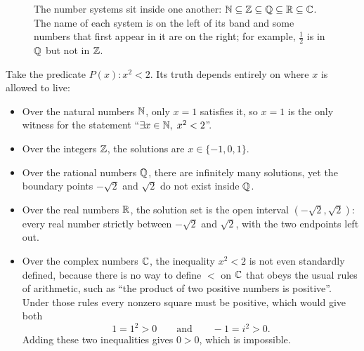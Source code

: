 \begin{figure}[htbp]
\centering
{}
\caption{The number systems sit inside one another: $\mathbb{N} \subseteq \mathbb{Z} \subseteq \mathbb{Q} \subseteq \mathbb{R} \subseteq \mathbb{C}$. The name of each system is on the left of its band and some numbers that first appear in it are on the right; for example, $\tfrac12$ is in $\mathbb{Q}$ but not in $\mathbb{Z}$.}
\label{02:fig-number-systems}
\end{figure}

Take the predicate $P(x) : x^2 < 2$. Its truth depends entirely on where $x$ is allowed to live:
\begin{itemize}
\item Over the natural numbers $\mathbb{N}$, only $x = 1$ satisfies it, so $x = 1$ is the only witness for the statement ``$\exists x \in \mathbb{N},\; x^2 < 2$''.
\item Over the integers $\mathbb{Z}$, the solutions are $x \in \{-1, 0, 1\}$.
\item Over the rational numbers $\mathbb{Q}$, there are infinitely many solutions, yet the boundary points $-\sqrt{2}$ and $\sqrt{2}$ do not exist inside $\mathbb{Q}$.
\item Over the real numbers $\mathbb{R}$, the solution set is the open interval $(-\sqrt{2}, \sqrt{2})$: every real number strictly between $-\sqrt{2}$ and $\sqrt{2}$, with the two endpoints left out.
\item Over the complex numbers $\mathbb{C}$, the inequality $x^2 < 2$ is not even standardly defined, because there is no way to define $<$ on $\mathbb{C}$ that obeys the usual rules of arithmetic, such as ``the product of two positive numbers is positive''. Under those rules every nonzero square must be positive, which would give both
\[
1 = 1^2 > 0 \qquad\text{and}\qquad -1 = i^2 > 0.
\]
Adding these two inequalities gives $0 > 0$, which is impossible.
\end{itemize}

